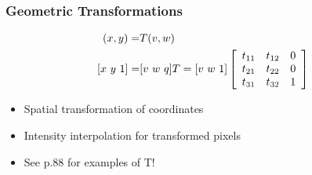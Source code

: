 \subsubsection{Geometric Transformations}
\begin{eqnarray}
(x,y) =& T{(v,w)} \notag \\
 \left[ x~y~1 \right] =& [ v~w~q ] T = [ v~w~1 ] 
 \left[ \begin{array}{ccc}
t_{11} & t_{12} & 0 \\
t_{21} & t_{22} & 0 \\
t_{31} & t_{32} & 1 \end{array} \right]
\end{eqnarray}
\begin{itemize}
\item Spatial transformation of coordinates
\item Intensity interpolation for transformed pixels
\item See p.88 for examples of T!
\end{itemize}
